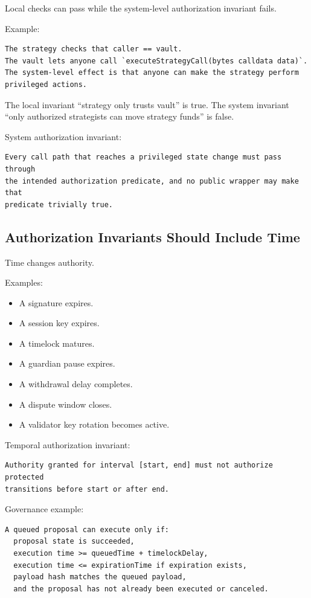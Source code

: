 Local checks can pass while the system-level authorization invariant
fails.

Example:

\begin{lstlisting}
The strategy checks that caller == vault.
The vault lets anyone call `executeStrategyCall(bytes calldata data)`.
The system-level effect is that anyone can make the strategy perform privileged actions.
\end{lstlisting}

The local invariant ``strategy only trusts vault'' is true. The system
invariant ``only authorized strategists can move strategy funds'' is
false.

System authorization invariant:

\begin{lstlisting}
Every call path that reaches a privileged state change must pass through
the intended authorization predicate, and no public wrapper may make that
predicate trivially true.
\end{lstlisting}

\subsection{Authorization Invariants Should Include Time}

Time changes authority.

Examples:

\begin{itemize}
\tightlist
\item
  A signature expires.
\item
  A session key expires.
\item
  A timelock matures.
\item
  A guardian pause expires.
\item
  A withdrawal delay completes.
\item
  A dispute window closes.
\item
  A validator key rotation becomes active.
\end{itemize}

Temporal authorization invariant:

\begin{lstlisting}
Authority granted for interval [start, end] must not authorize protected
transitions before start or after end.
\end{lstlisting}

Governance example:

\begin{lstlisting}
A queued proposal can execute only if:
  proposal state is succeeded,
  execution time >= queuedTime + timelockDelay,
  execution time <= expirationTime if expiration exists,
  payload hash matches the queued payload,
  and the proposal has not already been executed or canceled.
\end{lstlisting}

